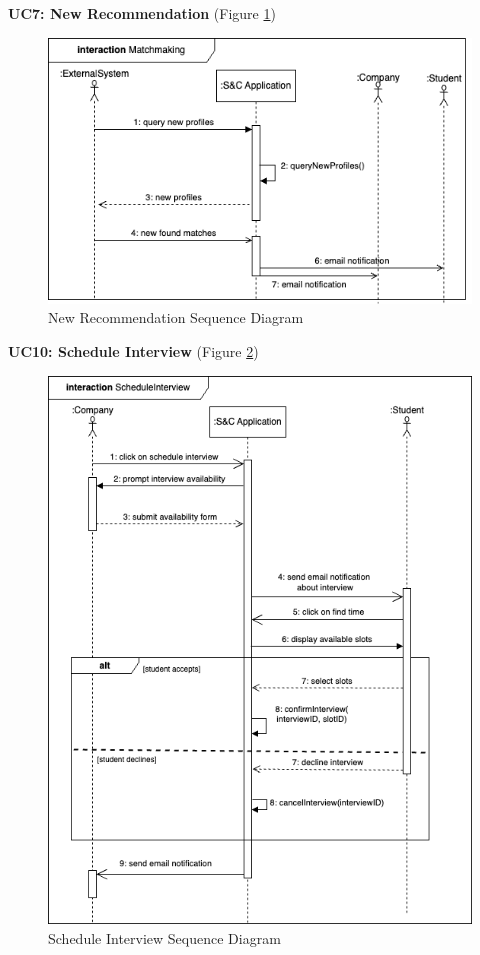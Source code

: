 \textbf{UC7: New Recommendation} (Figure \ref{fig:matchmaking})
\begin{figure}[H]
\centering
\includegraphics[width=\textwidth]{Images/matchmaking-sequence.png}
\caption{\label{fig:matchmaking} New Recommendation Sequence Diagram}
\end{figure}



\textbf{UC10: Schedule Interview} (Figure \ref{fig:schedule_sequence})
\begin{figure}[H]
\centering
\includegraphics[width=\textwidth]{Images/scheduleInterview-sequence.png}
\caption{\label{fig:schedule_sequence} Schedule Interview Sequence Diagram}
\end{figure}

